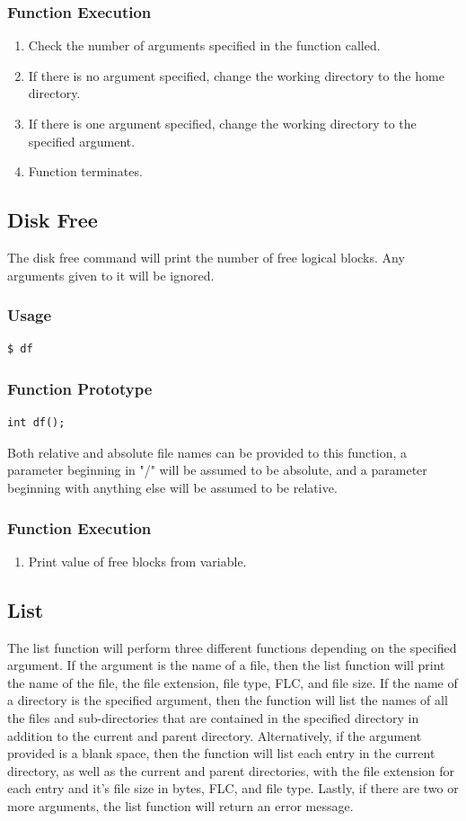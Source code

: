 \documentclass[12pt,letterpaper]{article}
\begin{document}
\subsubsection{Function Execution}
\begin{enumerate}
\item Check the number of arguments specified in the function called.
\item If there is no argument specified, change the working directory to the home directory.
\item If there is one argument specified, change the working directory to the specified argument.
\item Function terminates.
\end{enumerate}

\subsection{Disk Free}
The disk free command will print the number of free logical blocks. Any arguments given to it will be ignored.
\subsubsection{Usage}
\begin{verbatim}
$ df
\end{verbatim}
\subsubsection{Function Prototype}
\begin{verbatim}
int df();
\end{verbatim}
Both relative and absolute file names can be provided to this function, a parameter beginning in "/" will be assumed to be absolute, and a parameter beginning with anything else will be assumed to be relative.
\subsubsection{Function Execution}
\begin{enumerate}
\item Print value of free blocks from variable.
\end{enumerate}

\subsection{List}
The list function will perform three different functions depending on the specified argument. If the argument is the name of a file, then the list function will print the name of the file, the file extension, file type, FLC, and file size. If the name of a directory is the specified argument, then the function will list the names of all the files and sub-directories that are contained in the specified directory in addition to the current and parent directory. Alternatively, if the argument provided is a blank space, then the function will list each entry in the current directory, as well as the current and parent directories, with the file extension for each entry and it's file size in bytes, FLC, and file type. Lastly, if there are two or more arguments, the list function will return an error message.
\end{document}

